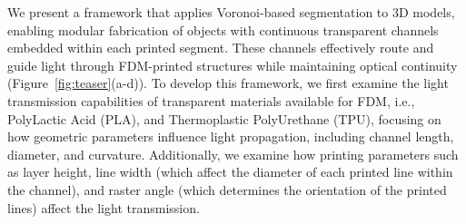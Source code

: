 We present a framework that applies Voronoi-based segmentation to 3D models, enabling modular fabrication of objects with continuous transparent channels embedded within each printed segment. These channels effectively route and guide light through FDM-printed structures while maintaining optical continuity (Figure~\ref{fig:teaser}(a-d)).
To develop this framework, we first examine the light transmission capabilities of transparent materials available for FDM, i.e., PolyLactic Acid (PLA), and Thermoplastic PolyUrethane (TPU), %
focusing on how geometric parameters influence light propagation, including channel length, diameter, and curvature. 
Additionally, we examine how printing parameters such as layer height, line width (which affect the diameter of each printed line within the channel),  and raster angle (which determines the orientation of the printed lines) affect the light transmission.



